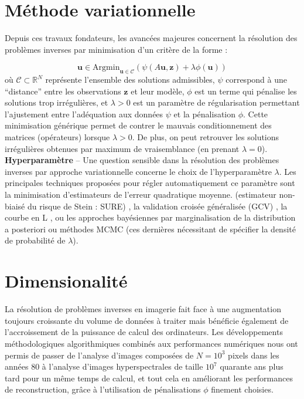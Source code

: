 \documentclass[a4paper, 12pt]{article} %
\begin{document}
\section{\large Méthode variationnelle}
Depuis ces travaux fondateurs, les avancées majeures concernent la résolution des problèmes inverses par minimisation d’un critère de la forme :

\[
\mathbf{u} \in \text{Argmin}_{\mathbf{u} \in \mathcal{C}} \left( \psi(A\mathbf{u}, \mathbf{z}) + \lambda \phi(\mathbf{u}) \right) \tag{2}
\]
où \( \mathcal{C} \subset \mathbb{R}^N \) représente l’ensemble des solutions admissibles, \( \psi \) correspond à une “distance” entre les observations \( \mathbf{z} \) et leur modèle, \( \phi \) est un terme qui pénalise les solutions trop irrégulières, et \( \lambda > 0 \) est un paramètre de régularisation permettant l’ajustement entre l’adéquation aux données \( \psi \) et la pénalisation \( \phi \).
Cette minimisation générique permet de contrer le mauvais conditionnement des matrices (opérateurs) lorsque \( \lambda > 0 \). De plus, on peut retrouver les solutions irrégulières obtenues par maximum de vraisemblance (en prenant \( \lambda = 0 \)).\\
\textbf{Hyperparamètre} – Une question sensible dans la résolution des problèmes inverses par approche variationnelle concerne le choix de l’hyperparamètre \( \lambda \). Les principales techniques proposées pour régler automatiquement ce paramètre sont la minimisation d’estimateurs de l’erreur quadratique moyenne.
(estimateur non-biaisé du risque de Stein : SURE) \cite{ref13}, la validation croisée généralisée (GCV) \cite{ref15}, la courbe en L \cite{ref19}, ou les approches bayésiennes par marginalisation de la distribution a posteriori ou méthodes MCMC (ces dernières nécessitant de spécifier la densité de probabilité de \( \lambda \)).
\section*{Dimensionalité}
La résolution de problèmes inverses en imagerie fait face à une augmentation toujours croissante du volume de données à traiter mais bénéficie également de l’accroissement de la puissance de calcul des ordinateurs. Les développements méthodologiques algorithmiques combinés aux performances numériques nous ont permis de passer de l’analyse d’images composées de \( N = 10^3 \) pixels dans les années 80 \cite{14} à l’analyse d’images hyperspectrales de taille \( 10^7 \) \cite{17} quarante ans plus tard pour un même temps de calcul, et tout cela en améliorant les performances de reconstruction, grâce à l’utilisation de pénalisations \( \phi \) finement choisies.
\end{document}
